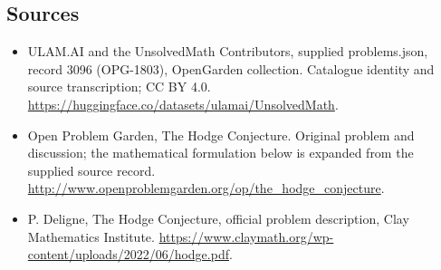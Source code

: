 \documentclass[11pt,a4paper]{article}
\begin{document}
\subsection{Sources}
\begin{itemize}
\item[S1] ULAM.AI and the UnsolvedMath Contributors, supplied problems.json, record 3096 (OPG-1803), OpenGarden collection. Catalogue identity and source transcription; CC BY 4.0.
\url{https://huggingface.co/datasets/ulamai/UnsolvedMath}.
\item[S2] Open Problem Garden, The Hodge Conjecture. Original problem and discussion; the mathematical formulation below is expanded from the supplied source record.
\url{http://www.openproblemgarden.org/op/the_hodge_conjecture}.
\item[S3] P. Deligne, The Hodge Conjecture, official problem description, Clay Mathematics Institute.
\url{https://www.claymath.org/wp-content/uploads/2022/06/hodge.pdf}.
\end{itemize}
\end{document}
